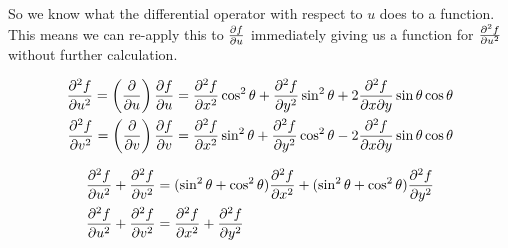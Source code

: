 \documentclass[10pt,\jkfside,a4paper]{article}
\begin{document}
So we know what the differential operator with respect to $u$ does to a function. This means 
we can re-apply this to $\pdv{f}{u}$ immediately giving us a function for $\pdv[2]{f}{u}$ 
without further calculation.

\begin{equation}
\begin{split}
\pdv[2]{f}{u} = \left(\pdv{u}\right)\pdv{f}{u} &= \pdv[2]{f}{x}\cos^2\theta + \pdv[2]{f}{y}\sin^2\theta + 2\pdv[2]{f}{x}{y}\sin\theta\cos\theta \\
\pdv[2]{f}{v} = \left(\pdv{v}\right)\pdv{f}{v} &= \pdv[2]{f}{x}\sin^2\theta + \pdv[2]{f}{y}\cos^2\theta - 2\pdv[2]{f}{x}{y}\sin\theta\cos\theta \\
\end{split}
\end{equation}

\begin{equation}
\begin{split}
\pdv[2]{f}{u} + \pdv[2]{f}{v} &= (\sin^2\theta + \cos^2\theta)\pdv[2]{f}{x} + (\sin^2\theta + \cos^2\theta)\pdv[2]{f}{y} \\
\pdv[2]{f}{u} + \pdv[2]{f}{v} &= \pdv[2]{f}{x} + \pdv[2]{f}{y} \\
\end{split}
\end{equation}
\end{document}
